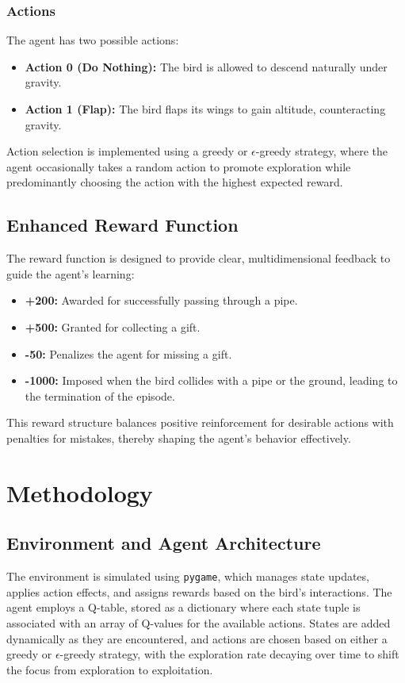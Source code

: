\documentclass[conference]{IEEEtran}
\begin{document}
\subsubsection{Actions}
The agent has two possible actions:
\begin{itemize}
    \item \textbf{Action 0 (Do Nothing):} The bird is allowed to descend naturally under gravity.
    \item \textbf{Action 1 (Flap):} The bird flaps its wings to gain altitude, counteracting gravity.
\end{itemize}
Action selection is implemented using a greedy or \(\epsilon\)-greedy strategy, where the agent occasionally takes a random action to promote exploration while predominantly choosing the action with the highest expected reward.

\subsection{Enhanced Reward Function}
The reward function is designed to provide clear, multidimensional feedback to guide the agent’s learning:
\begin{itemize}
    \item \textbf{+200:} Awarded for successfully passing through a pipe.
    \item \textbf{+500:} Granted for collecting a gift.
    \item \textbf{-50:} Penalizes the agent for missing a gift.
    \item \textbf{-1000:} Imposed when the bird collides with a pipe or the ground, leading to the termination of the episode.
\end{itemize}
This reward structure balances positive reinforcement for desirable actions with penalties for mistakes, thereby shaping the agent’s behavior effectively.

\section{Methodology}
\subsection{Environment and Agent Architecture}
The environment is simulated using \texttt{pygame}, which manages state updates, applies action effects, and assigns rewards based on the bird’s interactions. The agent employs a Q-table, stored as a dictionary where each state tuple is associated with an array of Q-values for the available actions. States are added dynamically as they are encountered, and actions are chosen based on either a greedy or \(\epsilon\)-greedy strategy, with the exploration rate decaying over time to shift the focus from exploration to exploitation.
\end{document}

